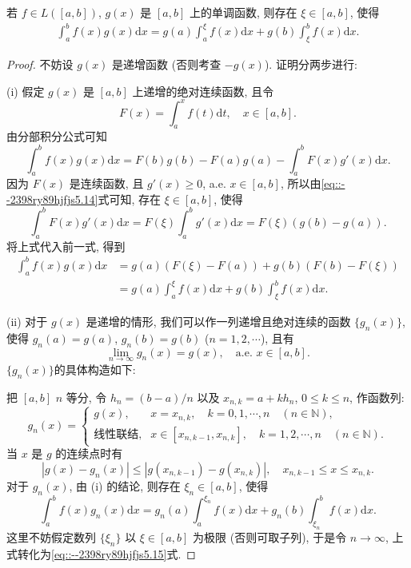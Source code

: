 \documentclass[../../main.tex]{subfiles}%
\begin{document}
\begin{theorem}[积分第二中值公式]\label{theorem:实变函数--积分第二中值公式}
若 $f\in L([a,b])$, $g(x)$ 是 $[a,b]$ 上的单调函数, 则存在 $\xi\in[a,b]$, 使得
\begin{align}
\int_a^b f(x)g(x)\mathrm{d}x = g(a)\int_a^\xi f(x)\mathrm{d}x + g(b)\int_\xi^b f(x)\mathrm{d}x. \label{eq::--2398ry89hjfjs5.15}
\end{align}
\end{theorem}
\begin{proof}
不妨设 $g(x)$ 是递增函数 (否则考查 $-g(x)$). 证明分两步进行:

(i) 假定 $g(x)$ 是 $[a,b]$ 上递增的绝对连续函数, 且令
\[
F(x) = \int_a^x f(t)\mathrm{d}t,\quad x\in[a,b].
\]
由分部积分公式可知
\[
\int_a^b f(x)g(x)\mathrm{d}x = F(b)g(b) - F(a)g(a) - \int_a^b F(x)g'(x)\mathrm{d}x.
\]
因为 $F(x)$ 是连续函数, 且 $g'(x)\geqslant 0$, a.e. $x\in[a,b]$, 所以由\eqref{eq::--2398ry89hjfjs5.14}式可知, 存在 $\xi\in[a,b]$, 使得
\[
\int_a^b F(x)g'(x)\mathrm{d}x = F(\xi)\int_a^b g'(x)\mathrm{d}x = F(\xi)(g(b)-g(a)).
\]
将上式代入前一式, 得到
\begin{align*}
\int_a^b f(x)g(x)\mathrm{d}x &= g(a)(F(\xi)-F(a)) + g(b)(F(b)-F(\xi)) \\
&= g(a)\int_a^\xi f(x)\mathrm{d}x + g(b)\int_\xi^b f(x)\mathrm{d}x.
\end{align*}

(ii) 对于 $g(x)$ 是递增的情形, 我们可以作一列递增且绝对连续的函数 $\{g_n(x)\}$, 使得 $g_n(a)=g(a)$, $g_n(b)=g(b)$ ($n=1,2,\cdots$), 且有
\[
\lim_{n\to\infty} g_n(x) = g(x),\quad \text{a.e. } x\in[a,b].
\]
$\{g_n(x)\}$的具体构造如下:

把 $[a,b]$ $n$ 等分, 令 $h_n = (b-a)/n$ 以及 $x_{n,k} = a + kh_n$, $0\leqslant k\leqslant n$, 作函数列:
\[
g_n(x) =
\begin{cases}
g(x), & x = x_{n,k}, \quad k=0,1,\cdots,n \quad (n\in\mathbb{N}), \\
\text{线性联结}, & x\in[x_{n,k-1},x_{n,k}], \quad k=1,2,\cdots,n \quad (n\in\mathbb{N}).
\end{cases}
\]
当 $x$ 是 $g$ 的连续点时有
\[
|g(x)-g_n(x)| \leqslant |g(x_{n,k-1})-g(x_{n,k})|,\quad x_{n,k-1}\leqslant x\leqslant x_{n,k}.
\]
对于 $g_n(x)$, 由 (i) 的结论, 则存在 $\xi_n\in[a,b]$, 使得
\[
\int_a^b f(x)g_n(x)\mathrm{d}x = g_n(a)\int_a^{\xi_n} f(x)\mathrm{d}x + g_n(b)\int_{\xi_n}^b f(x)\mathrm{d}x.
\]
这里不妨假定数列 $\{\xi_n\}$ 以 $\xi\in[a,b]$ 为极限 (否则可取子列), 于是令 $n\to\infty$, 上式转化为\eqref{eq::--2398ry89hjfjs5.15}式.
\end{proof}
\end{document}
